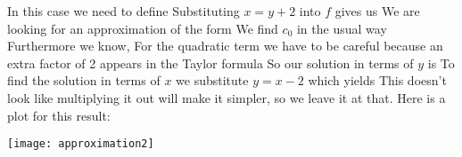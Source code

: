 \solution
In this case we need to define 
Substituting $x=y+2$ into $f$ gives us 
We are looking for an approximation of the form 
We find $c_0$ in the usual way
Furthermore we know,
For the quadratic term we have to be careful because an extra factor of 2 appears in the Taylor formula
So our solution in terms of $y$ is 
To find the solution in terms of $x$ we substitute $y=x-2$ which yields 
This doesn't look like multiplying it out will make it simpler, so we leave it at that. Here is a plot for this result:
\begin{center}
    \texttt{[image: approximation2]}
\end{center}
